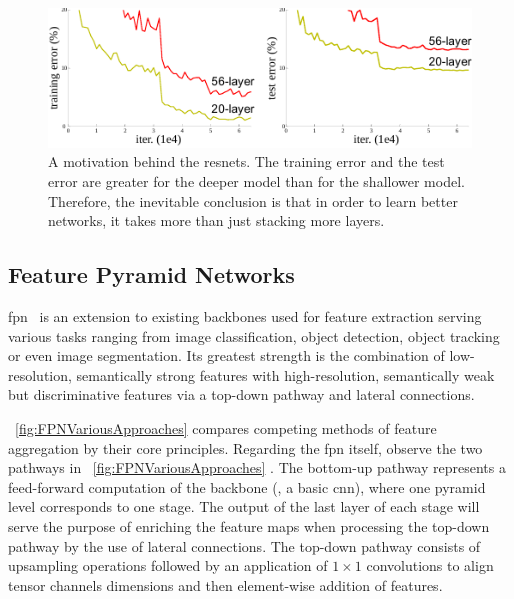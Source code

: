 \begin{figure}[t]
    \centerline{\includegraphics[width=0.8\linewidth]{figures/theoretical_foundations/resnet_motivation.pdf}}
    \caption[\Gls{resnet} motivation]{A motivation behind the \glspl{resnet}. The training error and the test error are greater for the deeper model than for the shallower model. Therefore, the inevitable conclusion is that in order to learn better networks, it takes more than just stacking more layers. }
    \label{fig:ResnetMotivation}
\end{figure}

\subsection{Feature Pyramid Networks}
\label{ssec:FeaturePyramidNetworks}


\Gls{fpn}~\cite{lin2017fpn} is an extension to existing backbones used for feature extraction serving various tasks ranging from image classification, object detection, object tracking or even image segmentation. Its greatest strength is the combination of low-resolution, semantically strong features with high-resolution, semantically weak but discriminative features via a top-down pathway and lateral connections.

\figtext{}~\ref{fig:FPNVariousApproaches} compares competing methods of feature aggregation by their core principles. Regarding the \gls{fpn} itself, observe the two pathways in \figtext{}~\ref{fig:FPNVariousApproaches} . The bottom-up pathway represents a feed-forward computation of the backbone (\egtext{}, a basic \gls{cnn}), where one pyramid level corresponds to one stage. The output of the last layer of each stage will serve the purpose of enriching the feature maps when processing the top-down pathway by the use of lateral connections. The top-down pathway consists of upsampling operations followed by an application of $1 \times 1$ convolutions to align tensor channels dimensions and then element-wise addition of features.

